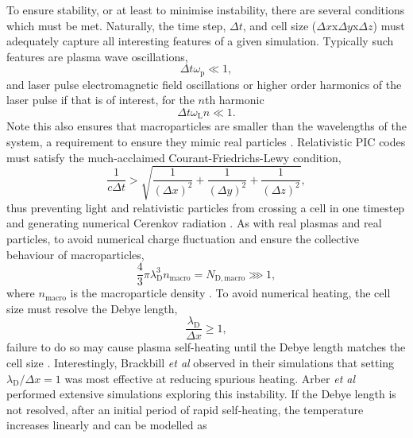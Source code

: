 To ensure stability, or at least to minimise instability, there are several conditions which must be met. Naturally, the time step, $\Delta t$, and cell size ($\Delta x$x$\Delta y$x$\Delta z$) must adequately capture all interesting features of a given simulation. Typically such features are plasma wave oscillations,
\begin{equation}
	\Delta t \omega_\mathrm{p} \ll 1,
\end{equation} 
and laser pulse electromagnetic field oscillations or higher order harmonics of the laser pulse if that is of interest, for the $n$th harmonic
\begin{equation}
	\Delta t\omega_\mathrm{L}n \ll 1.
\end{equation} 
Note this also ensures that macroparticles are smaller than the wavelengths of the system, a requirement to ensure they mimic real particles \cite{okudaCollisionsPlasmaFiniteSize1970}. Relativistic PIC codes must satisfy the much-acclaimed \cite{demouraCourantFriedrichsLewy2013} Courant-Friedrichs-Lewy condition,
\begin{equation}
	\frac{1}{c\Delta t} > \sqrt{\frac{1}{(\Delta x)^2}+\frac{1}{(\Delta y)^2}+\frac{1}{(\Delta z)^2}},
\end{equation}
thus preventing light and relativistic particles from crossing a cell in one timestep and generating numerical Cerenkov radiation \cite{birdsall2004plasma}. As with real plasmas and real particles, to avoid numerical charge fluctuation and ensure the collective behaviour of macroparticles,
\begin{equation}
	\frac{4}{3}\pi\lambda_\mathrm{D}^3n_\mathrm{macro} = N_\mathrm{D,macro} \ggg 1,
\end{equation}
where $n_\mathrm{macro}$ is the macroparticle density \cite{birdsall2004plasma}. To avoid numerical heating, the cell size must resolve the Debye length,
\begin{equation}
	\frac{\lambda_\mathrm{D}}{\Delta x} \ge 1,
\end{equation}
failure to do so may cause plasma self-heating until the Debye length matches the cell size \cite{birdsall2004plasma}. Interestingly, Brackbill \textit{et al} \cite{brackbillEnergyMomentumConservation2016} observed in their simulations that setting $\lambda_\mathrm{D}/\Delta x =1$ was most effective at reducing spurious heating. Arber \textit{et al} \cite{arberContemporaryParticleincellApproach2015} performed extensive simulations exploring this instability. If the Debye length is not resolved, after an initial period of rapid self-heating, the temperature increases linearly and can be modelled as

